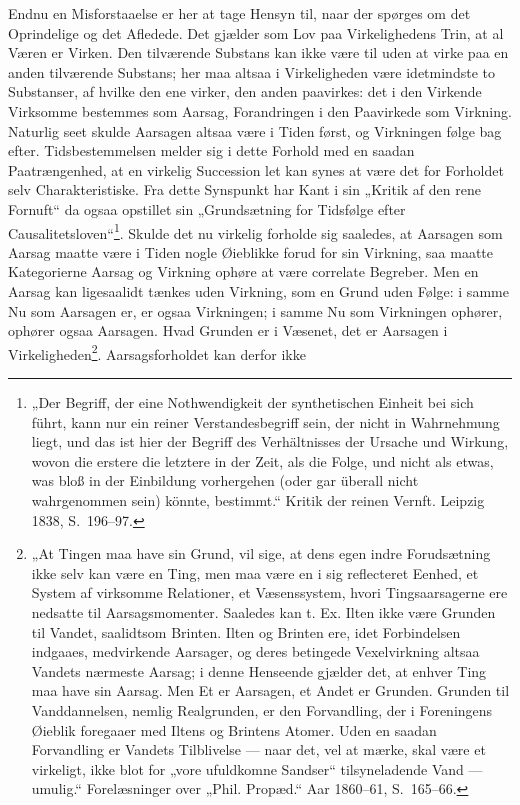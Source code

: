 \documentclass[11pt]{book}
\newcommand{\opage}[1]{\marginnote{\footnotesize\textit{[#1]}}}
\begin{document}
Endnu en Misforstaaelse er her at tage Hensyn til, naar der spørges om
det Oprindelige og det Afledede. Det gjælder som Lov paa Virkelighedens
Trin, at al Væren er Virken. Den tilværende Substans kan ikke være til
uden at virke paa en anden tilværende Substans; her maa altsaa i
Virkeligheden være idetmindste to Substanser, af hvilke den ene virker,
den anden paavirkes: det i den Virkende Virksomme bestemmes som Aarsag,
Forandringen i den Paavirkede som Virkning. Naturlig seet skulde
Aarsagen altsaa være i Tiden først, og Virkningen følge bag efter.
Tidsbestemmelsen melder sig i dette Forhold med en saadan
Paatrængenhed, at en virkelig Succession let kan synes at være det for
Forholdet selv Charakteristiske. Fra dette Synspunkt har Kant i sin
„Kritik af den rene Fornuft“ da ogsaa opstillet sin „Grundsætning for
Tidsfølge efter Causalitetsloven“\footnote{„Der Begriff, der eine
Nothwendigkeit der synthetischen Einheit bei sich führt, kann nur ein
reiner Verstandesbegriff sein, der nicht in Wahrnehmung liegt, und das
ist hier der Begriff des Verhältnisses der Ursache und Wirkung, wovon die
erstere die letztere in der Zeit, als die Folge, und nicht als etwas, was
bloß in der Einbildung vorhergehen (oder gar überall nicht wahrgenommen
sein) könnte, bestimmt.“ Kritik der reinen Vernft. Leipzig 1838, S.\
196--97.}.
Skulde det nu virkelig forholde sig saaledes, at Aarsagen som Aarsag
maatte være i Tiden nogle Øieblikke forud for sin Virkning, saa maatte
Kategorierne Aarsag og Virkning ophøre at være correlate Begreber. Men en
Aarsag kan ligesaalidt tænkes uden Virkning, som en Grund uden Følge: i
samme Nu som Aarsagen er, er ogsaa Virkningen; i samme Nu som Virkningen
ophører, ophører ogsaa Aarsagen. Hvad Grunden er
\opage{118} \setcounter{footnote}{0}%
i Væsenet, det er Aarsagen i Virkeligheden\footnote{„At Tingen maa have
sin Grund, vil sige, at dens egen indre Forudsætning ikke selv kan være
en Ting, men maa være en i sig reflecteret Eenhed, et System af
virksomme Relationer, et Væsenssystem, hvori Tingsaarsagerne ere
nedsatte til Aarsagsmomenter. Saaledes kan t. Ex. Ilten ikke være
Grunden til Vandet, saalidtsom Brinten. Ilten og Brinten ere, idet
Forbindelsen indgaaes, medvirkende Aarsager, og deres betingede
Vexelvirkning altsaa Vandets nærmeste Aarsag; i denne Henseende gjælder
det, at enhver Ting maa have sin Aarsag. Men Et er Aarsagen, et Andet er
Grunden. Grunden til Vanddannelsen, nemlig Realgrunden, er den
Forvandling, der i Foreningens Øieblik foregaaer med Iltens og Brintens
Atomer. Uden en saadan Forvandling er Vandets Tilblivelse --- naar det,
vel at mærke, skal være et virkeligt, ikke blot for „vore ufuldkomne
Sandser“ tilsyneladende Vand --- umulig.“ Forelæsninger over „Phil.
Propæd.“ Aar 1860--61, S.\ 165--66.}. Aarsagsforholdet kan derfor ikke
\end{document}
